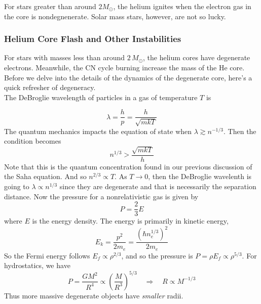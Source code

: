 \documentclass[10pt]{article}
\numberwithin{equation}{section}
\newcommand{\n}{\noindent}
\begin{document}
    \n For stars greater than around $2 M_\odot$, the helium ignites
    when the electron gas in the core is nondegnenerate. Solar mass
    stars, however, are not so lucky.

    \subsubsection{Helium Core Flash and Other Instabilities}
    \label{sec:helium-core-flash}

    For stars with masses less than around $2\,M_\odot$, the helium
    cores have degenerate electrons. Meanwhile, the CN cycle burning
    increase the mass of the He core. Before we delve into the details
    of the dynamics of the degenerate core, here's a quick refresher
    of degeneracy.\\

    \n The DeBroglie wavelength of particles in a gas of temperature
    $T$ is

    \begin{equation}
      \label{eq:277}
      \lambda=\frac{h}{p}=\frac{h}{\sqrt{mkT}}
    \end{equation}
    The quantum mechanics impacts the equation of state when $\lambda
    \gtrsim n^{-1/3}$. Then the condition becomes
    \begin{equation}
      \label{eq:278}
      n^{1/3}>\frac{\sqrt{mkT}}{h}
    \end{equation}
    Note that this is the quantum concentration found in our previous
    discussion of the Saha equation. And so $n^{2/3}\propto T$. As
    $T\to 0$, then the DeBroglie wavelenth is going to $\lambda\propto
    n^{1/3}$ since they are degenerate and that is necessarily the
    separation distance. Now the pressure for a nonrelativistic gas is
    given by
    \begin{equation}
      \label{eq:279}
      P=\frac{2}{3}E
    \end{equation}
    where $E$ is the energy density. The energy is primarily in
    kinetic energy,
    \begin{equation}
      \label{eq:280}
      E_k=\frac{p^2}{2m_e}=\frac{(\hbar n_e^{1/3})^2}{2m_e}
    \end{equation}
    So the Fermi energy follows $E_f\propto \rho^{2/3}$, and so the
    pressure is $P=\rho E_f\propto \rho^{5/3}$. For hydrostatics, we
    have
    \begin{equation}
      \label{eq:281}
      P=\frac{GM^2}{R^4}\propto
      \left(\frac{M}{R^3}\right)^{5/3}\quad\Rightarrow \quad R\propto M^
{-1/3}
    \end{equation} 
    Thus more massive degenerate objects have \emph{smaller}
    radii.\\   
\end{document}
